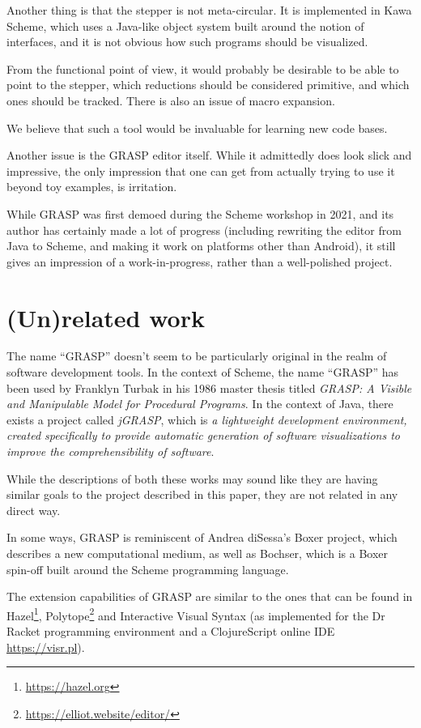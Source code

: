 \documentclass[acmsmall]{acmart}
\begin{document}
Another thing is that the stepper is not meta-circular. It is
implemented in Kawa Scheme, which uses a Java-like object system built
around the notion of interfaces, and it is not obvious how such
programs should be visualized.

From the functional point of view, it would probably be desirable to be
able to point to the stepper, which reductions should be considered
primitive, and which ones should be tracked. There is also an issue
of macro expansion.

We believe that such a tool would be invaluable for learning new
code bases.

Another issue is the GRASP editor itself. While it admittedly does
look slick and impressive, the only impression that one can get from
actually trying to use it beyond toy examples, is irritation.

While GRASP was first demoed during the Scheme workshop in
2021\cite{Godek2021}, and its author has certainly made a lot of
progress (including rewriting the editor from Java to Scheme, and
making it work on platforms other than Android), it still gives an
impression of a work-in-progress, rather than a well-polished project.

\section{(Un)related work}

The name ``GRASP'' doesn't seem to be particularly original in the
realm of software development tools. In the context of Scheme, the
name ``GRASP'' has been used by Franklyn Turbak in his 1986 master
thesis titled \textit{GRASP: A Visible and Manipulable Model for
  Procedural Programs}\cite{Turbak}. In the context of Java, there
exists a project called \textit{jGRASP}, which is \textit{a
  lightweight development environment, created specifically to provide
  automatic generation of software visualizations to improve the
  comprehensibility of software}\cite{jGRASP}.

While the descriptions of both these works may sound like they are
having similar goals to the project described in this paper, they are
not related in any direct way.

In some ways, GRASP is reminiscent of Andrea diSessa's Boxer
project\cite{Boxer}, which describes a new computational medium, as
well as Bochser\cite{Bochser}, which is a Boxer spin-off built around
the Scheme programming language.

The extension capabilities of GRASP are similar to the ones that can
be found in Hazel\footnote{\url{https://hazel.org}},
Polytope\footnote{\url{https://elliot.website/editor/}} and
Interactive Visual Syntax (as implemented for the Dr Racket
programming environment and a ClojureScript online IDE
\url{https://visr.pl})\cite{Andersen}.
\end{document}

